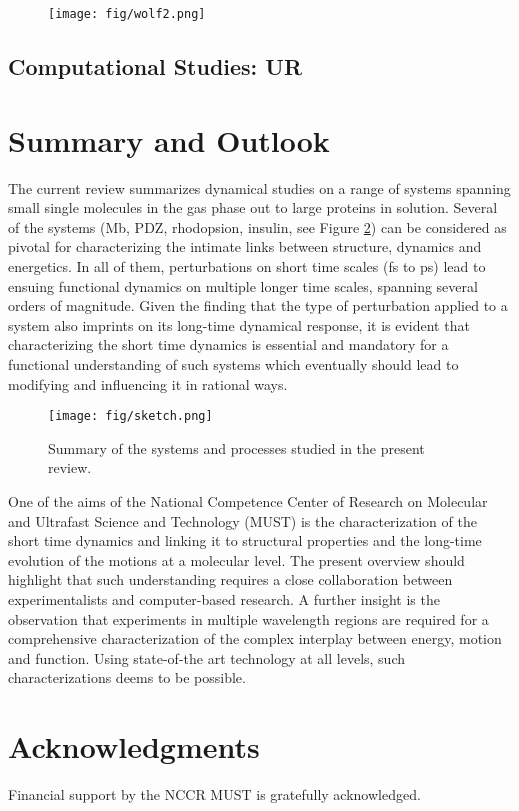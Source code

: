 \documentclass[journal=jacsat,manuscript=article]{achemso}
\begin{document}
\begin{figure}
\texttt{[image: fig/wolf2.png]}
\caption{        }
\label{fig:wolf2}
\end{figure} 

\subsection{Computational Studies: UR}




\section{Summary and Outlook}
The current review summarizes dynamical studies on a range of systems
spanning small single molecules in the gas phase out to large proteins
in solution. Several of the systems (Mb, PDZ, rhodopsion, insulin, see
Figure \ref{fig:sketch}) can be considered as pivotal for
characterizing the intimate links between structure, dynamics and
energetics. In all of them, perturbations on short time scales (fs to
ps) lead to ensuing functional dynamics on multiple longer time
scales, spanning several orders of magnitude. Given the finding that
the type of perturbation applied to a system also imprints on its
long-time dynamical response, it is evident that characterizing the
short time dynamics is essential and mandatory for a functional
understanding of such systems which eventually should lead to
modifying and influencing it in rational ways.

\begin{figure}
\texttt{[image: fig/sketch.png]}
\caption{Summary of the systems and processes studied in the present
  review.}
\label{fig:sketch}
\end{figure} 
    
One of the aims of the National Competence Center of Research on
Molecular and Ultrafast Science and Technology (MUST) is the
characterization of the short time dynamics and linking it to
structural properties and the long-time evolution of the motions at a
molecular level. The present overview should highlight that such
understanding requires a close collaboration between experimentalists
and computer-based research. A further insight is the observation that
experiments in multiple wavelength regions are required for a
comprehensive characterization of the complex interplay between
energy, motion and function. Using state-of-the art technology at all
levels, such characterizations deems to be possible.

\section*{Acknowledgments}
Financial support by the NCCR MUST is gratefully acknowledged.



\end{document}
